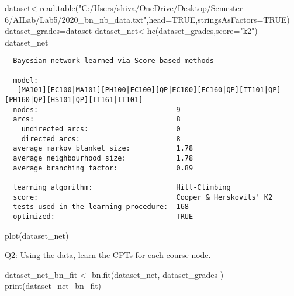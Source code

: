\documentclass[
]{article}
\newenvironment{Shaded}{\begin{snugshade}}{\end{snugshade}}
\newcommand{\AttributeTok}[1]{\textcolor[rgb]{0.77,0.63,0.00}{#1}}
\newcommand{\ConstantTok}[1]{\textcolor[rgb]{0.00,0.00,0.00}{#1}}
\newcommand{\FunctionTok}[1]{\textcolor[rgb]{0.00,0.00,0.00}{#1}}
\newcommand{\NormalTok}[1]{#1}
\newcommand{\OtherTok}[1]{\textcolor[rgb]{0.56,0.35,0.01}{#1}}
\newcommand{\StringTok}[1]{\textcolor[rgb]{0.31,0.60,0.02}{#1}}
\begin{document}
\begin{Shaded}
\begin{Highlighting}[]
\NormalTok{dataset}\OtherTok{\textless{}{-}}\FunctionTok{read.table}\NormalTok{(}\StringTok{"C:/Users/shiva/OneDrive/Desktop/Semester{-}6/AILab/Lab5/2020\_bn\_nb\_data.txt"}\NormalTok{,}\AttributeTok{head=}\ConstantTok{TRUE}\NormalTok{,}\AttributeTok{stringsAsFactors=}\ConstantTok{TRUE}\NormalTok{)}
\NormalTok{dataset\_grades}\OtherTok{=}\NormalTok{dataset}
\NormalTok{dataset\_net}\OtherTok{\textless{}{-}}\FunctionTok{hc}\NormalTok{(dataset\_grades,}\AttributeTok{score=}\StringTok{"k2"}\NormalTok{)}
\NormalTok{dataset\_net}
\end{Highlighting}
\end{Shaded}

\begin{verbatim}
  Bayesian network learned via Score-based methods

  model:
   [MA101][EC100|MA101][PH100|EC100][QP|EC100][EC160|QP][IT101|QP][PH160|QP][HS101|QP][IT161|IT101] 
  nodes:                                 9 
  arcs:                                  8 
    undirected arcs:                     0 
    directed arcs:                       8 
  average markov blanket size:           1.78 
  average neighbourhood size:            1.78 
  average branching factor:              0.89 

  learning algorithm:                    Hill-Climbing 
  score:                                 Cooper & Herskovits' K2 
  tests used in the learning procedure:  168 
  optimized:                             TRUE 
\end{verbatim}

\begin{Shaded}
\begin{Highlighting}[]
\FunctionTok{plot}\NormalTok{(dataset\_net)}
\end{Highlighting}
\end{Shaded}

Q2: Using the data, learn the CPTs for each course node.

\begin{Shaded}
\begin{Highlighting}[]
\NormalTok{dataset\_net\_bn\_fit }\OtherTok{\textless{}{-}} \FunctionTok{bn.fit}\NormalTok{(dataset\_net, dataset\_grades )}
\FunctionTok{print}\NormalTok{(dataset\_net\_bn\_fit)}
\end{Highlighting}
\end{Shaded}
\end{document}
